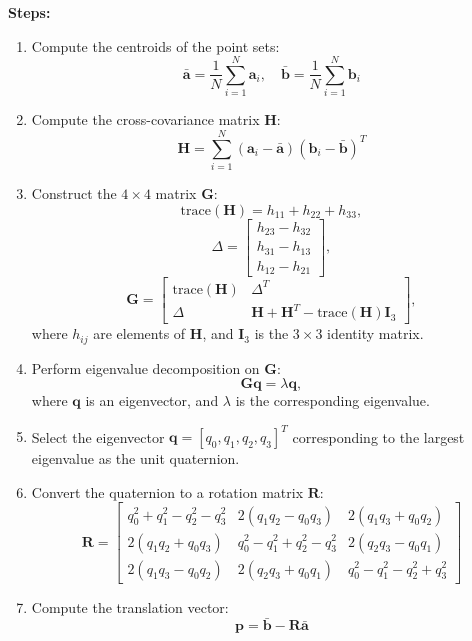 \documentclass[english,10pt,a4paper]{book}
\begin{document}
    \textbf{Steps:}
    \begin{enumerate}
    	\item Compute the centroids of the point sets:
    	\[
    	\bar{\mathbf{a}} = \frac{1}{N} \sum_{i=1}^N \mathbf{a}_i, \quad \bar{\mathbf{b}} = 		\frac{1}{N} \sum_{i=1}^N \mathbf{b}_i
    	\]
    	\item Compute the cross-covariance matrix $\mathbf{H}$:
    	\[
    	\mathbf{H} = \sum_{i=1}^N (\mathbf{a}_i - \bar{\mathbf{a}}) (\mathbf{b}_i - 		\bar{\mathbf{b}})^T
    	\]
    	\item Construct the $4 \times 4$ matrix $\mathbf{G}$:
    	\[
    	\text{trace}(\mathbf{H}) = h_{11} + h_{22} + h_{33},
    	\]
    	\[
    	\Delta = \begin{bmatrix} h_{23} - h_{32} \\ h_{31} - h_{13} \\ h_{12} - h_{21} 		\end{bmatrix},
    	\]
    	\[
    	\mathbf{G} = \begin{bmatrix}
    		\text{trace}(\mathbf{H}) & \Delta^T \\
    		\Delta & \mathbf{H} + \mathbf{H}^T - \text{trace}(\mathbf{H}) \mathbf{I}_3
    	\end{bmatrix},
    	\]
    	where $h_{ij}$ are elements of $\mathbf{H}$, and $\mathbf{I}_3$ is the $3 \times 3$ identity matrix.
    	\item Perform eigenvalue decomposition on $\mathbf{G}$:
    	\[
    	\mathbf{G} \mathbf{q} = \lambda \mathbf{q},
    	\]
    	where $\mathbf{q}$ is an eigenvector, and $\lambda$ is the corresponding eigenvalue.
    	\item Select the eigenvector $\mathbf{q} = [q_0, q_1, q_2, q_3]^T$ corresponding to the largest eigenvalue as the unit quaternion.
    	\item Convert the quaternion to a rotation matrix $\mathbf{R}$:
    	\[
    	\mathbf{R} = \begin{bmatrix}
    		q_0^2 + q_1^2 - q_2^2 - q_3^2 & 2(q_1 q_2 - q_0 q_3) & 2(q_1 q_3 + q_0 q_2) \\
    		2(q_1 q_2 + q_0 q_3) & q_0^2 - q_1^2 + q_2^2 - q_3^2 & 2(q_2 q_3 - q_0 q_1) \\
    		2(q_1 q_3 - q_0 q_2) & 2(q_2 q_3 + q_0 q_1) & q_0^2 - q_1^2 - q_2^2 + q_3^2
    	\end{bmatrix}
    	\]
    	\item Compute the translation vector:
    	\[
    	\mathbf{p} = \bar{\mathbf{b}} - \mathbf{R} \bar{\mathbf{a}}
    	\]
    \end{enumerate}
    
\end{document}
